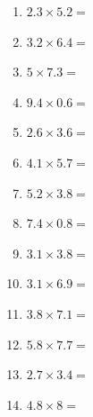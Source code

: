 \documentclass[12pt]{article}
\begin{document}
\begin{enumerate}
\item \large $ 2.3 \times 5.2 = $ \vspace{1.5cm}
\item \large $ 3.2 \times 6.4 = $ \vspace{1.5cm}
\item \large $ 5 \times 7.3 = $ \vspace{1.5cm}
\item \large $ 9.4 \times 0.6 = $ \vspace{1.5cm}
\newpage
\item \large $ 2.6 \times 3.6 = $ \vspace{1.5cm}
\item \large $ 4.1 \times 5.7 = $ \vspace{1.5cm}
\item \large $ 5.2 \times 3.8 = $ \vspace{1.5cm}
\item \large $ 7.4 \times 0.8 = $ \vspace{1.5cm}
\item \large $ 3.1 \times 3.8 = $ \vspace{1.5cm}
\item \large $ 3.1 \times 6.9 = $ \vspace{1.5cm}
\item \large $ 3.8 \times 7.1 = $ \vspace{1.5cm}
\item \large $ 5.8 \times 7.7 = $ \vspace{1.5cm}
\item \large $ 2.7 \times 3.4 = $ \vspace{1.5cm}
\item \large $ 4.8 \times 8 = $ \vspace{1.5cm}
\end{enumerate}\newpage
\end{document}
